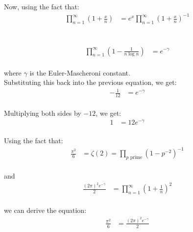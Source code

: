 \documentclass{article}
\begin{document}
Now, using the fact that: \\

\begin{align*}
\prod_{n=1}^{\infty} \left(1 + \frac{x}{n}\right) &= e^x \prod_{n=1}^{\infty} \left(1 + \frac{x}{n}\right)^{-1} \\
\end{align*}

 \\

\begin{align*}
\prod_{n=1}^{\infty} \left(1 - \frac{1}{n \log n}\right) &= e^{-\gamma} \\
\end{align*}

where $\gamma$ is the Euler-Mascheroni constant. \\

Substituting this back into the previous equation, we get: \\

\begin{align*}
-\frac{1}{12} &= e^{-\gamma} \\
\end{align*}

Multiplying both sides by $-12$, we get: \\

\begin{align*}
1 &= 12e^{-\gamma} \\
\end{align*}

Using the fact that: \\

\begin{align*}
\frac{\pi^2}{6} &= \zeta(2) = \prod_{p \text{ prime}} (1 - p^{-2})^{-1} \\
\end{align*}

and \\

\begin{align*}
\frac{(2\pi)^2 e^{-\gamma}}{2} &= \prod_{n=1}^{\infty} \left(1 + \frac{1}{n}\right)^2 \\
\end{align*}

we can derive the equation: \\

\begin{align*}
\frac{\pi^2}{6} &= \frac{(2\pi)^2 e^{-\gamma}}{2} \\
\end{align*}
\end{document}
